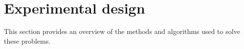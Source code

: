 \section{Experimental design}
This section provides an overview of the methods and algorithms used to solve these problems.




